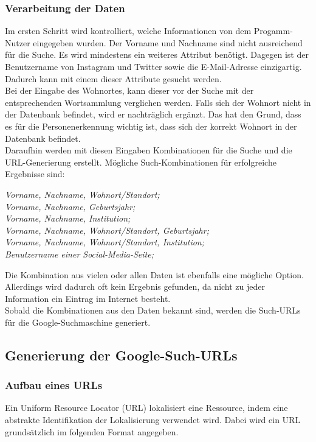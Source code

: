 		\subsubsection{Verarbeitung der Daten}
		Im ersten Schritt wird kontrolliert, welche Informationen von dem Progamm-Nutzer eingegeben wurden. Der Vorname und Nachname sind nicht ausreichend für die Suche. Es wird mindestens ein weiteres Attribut benötigt. Dagegen ist der Benutzername von Instagram und Twitter sowie die E-Mail-Adresse einzigartig. Dadurch kann mit einem dieser Attribute gesucht werden.\\
		Bei der Eingabe des Wohnortes, kann dieser vor der Suche mit der entsprechenden Wortsammlung verglichen werden. Falls sich der Wohnort nicht in der Datenbank befindet, wird er nachträglich ergänzt. Das hat den Grund, dass es für die Personenerkennung wichtig ist, dass sich der korrekt Wohnort in der Datenbank befindet.\\
		Daraufhin werden mit diesen Eingaben Kombinationen für die Suche und die URL-Generierung erstellt. Mögliche Such-Kombinationen für erfolgreiche Ergebnisse sind:
		
		\textit{Vorname, Nachname, Wohnort/Standort;}\\
		\textit{Vorname, Nachname, Geburtsjahr;}\\
		\textit{Vorname, Nachname, Institution;}\\
		\textit{Vorname, Nachname, Wohnort/Standort, Geburtsjahr;}\\
		\textit{Vorname, Nachname, Wohnort/Standort, Institution;}\\
		\textit{Benutzername einer Social-Media-Seite;}
		
		
		Die Kombination aus vielen oder allen Daten ist ebenfalls eine mögliche Option. Allerdings wird dadurch oft kein Ergebnis gefunden, da nicht zu jeder Information ein Eintrag im Internet besteht.\\
		Sobald die Kombinationen aus den Daten bekannt sind, werden die Such-URLs für die Google-Suchmaschine generiert.
		\subsection{Generierung der Google-Such-URLs}
			\subsubsection{Aufbau eines URLs}
			\label{subsec:AufbauURL}
			Ein Uniform Resource Locator (URL) lokalisiert eine Ressource, indem eine abstrakte Identifikation der Lokalisierung verwendet wird. Dabei wird ein URL grundsätzlich im folgenden Format angegeben.\cite{RFC1738}
			
